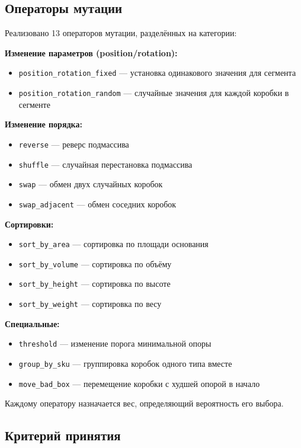 \subsection{Операторы мутации}

Реализовано 13 операторов мутации, разделённых на категории:

\textbf{Изменение параметров (position/rotation):}
\begin{itemize}
    \item \texttt{position\_rotation\_fixed} --- установка одинакового значения для сегмента
    \item \texttt{position\_rotation\_random} --- случайные значения для каждой коробки в сегменте
\end{itemize}

\textbf{Изменение порядка:}
\begin{itemize}
    \item \texttt{reverse} --- реверс подмассива
    \item \texttt{shuffle} --- случайная перестановка подмассива
    \item \texttt{swap} --- обмен двух случайных коробок
    \item \texttt{swap\_adjacent} --- обмен соседних коробок
\end{itemize}

\textbf{Сортировки:}
\begin{itemize}
    \item \texttt{sort\_by\_area} --- сортировка по площади основания
    \item \texttt{sort\_by\_volume} --- сортировка по объёму
    \item \texttt{sort\_by\_height} --- сортировка по высоте
    \item \texttt{sort\_by\_weight} --- сортировка по весу
\end{itemize}

\textbf{Специальные:}
\begin{itemize}
    \item \texttt{threshold} --- изменение порога минимальной опоры
    \item \texttt{group\_by\_sku} --- группировка коробок одного типа вместе
    \item \texttt{move\_bad\_box} --- перемещение коробки с худшей опорой в начало
\end{itemize}

Каждому оператору назначается вес, определяющий вероятность его выбора.

\subsection{Критерий принятия}


